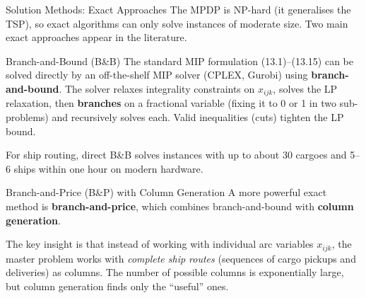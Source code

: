 \documentclass[aspectratio=169,10pt]{beamer}
\begin{document}
\begin{frame}[allowframebreaks]{Solution Methods: Exact Approaches}
  The MPDP is NP-hard (it generalises the TSP), so exact algorithms can
  only solve instances of moderate size.  Two main exact approaches appear
  in the literature.

  \medskip
  \begin{block}{Branch-and-Bound (B\&B)}
    The standard MIP formulation (13.1)--(13.15) can be solved directly by
    an off-the-shelf MIP solver (CPLEX, Gurobi) using \textbf{branch-and-bound}.
    The solver relaxes integrality constraints on $x_{ijk}$, solves the LP
    relaxation, then \textbf{branches} on a fractional variable (fixing it to
    0 or 1 in two sub-problems) and recursively solves each.  Valid inequalities
    (cuts) tighten the LP bound.

    For ship routing, direct B\&B solves instances with up to about
    30 cargoes and 5--6 ships within one hour on modern hardware.
  \end{block}

  \begin{block}{Branch-and-Price (B\&P) with Column Generation}
    A more powerful exact method is \textbf{branch-and-price}, which combines
    branch-and-bound with \textbf{column generation}.

    The key insight is that instead of working with individual arc variables
    $x_{ijk}$, the master problem works with \emph{complete ship routes}
    (sequences of cargo pickups and deliveries) as columns.  The number of
    possible columns is exponentially large, but column generation finds only
    the ``useful'' ones.


\end{block}
\end{frame}
\end{document}
